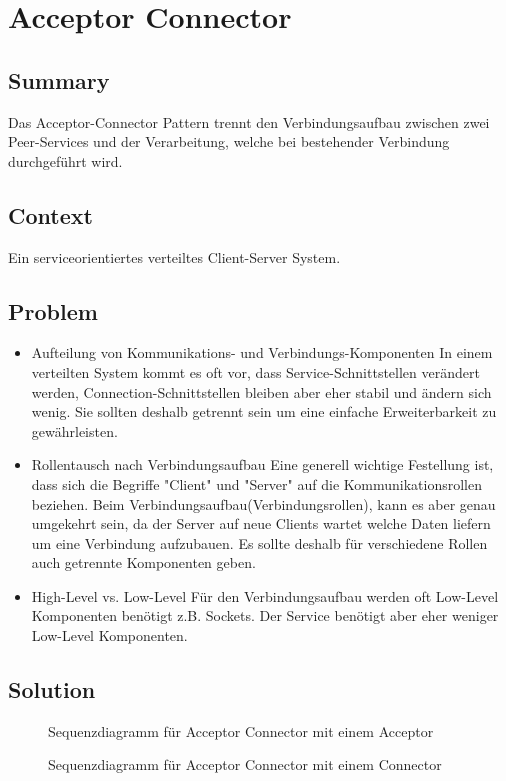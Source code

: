 \chapter{Acceptor Connector}

\section{Summary}
Das Acceptor-Connector Pattern trennt den Verbindungsaufbau zwischen zwei Peer-Services und der Verarbeitung, welche bei bestehender Verbindung durchgeführt wird.

\section{Context}
Ein serviceorientiertes verteiltes Client-Server System.

\section{Problem}
\begin{itemize}
  \item Aufteilung von Kommunikations- und Verbindungs-Komponenten In einem verteilten System kommt es oft vor, dass Service-Schnittstellen verändert werden, Connection-Schnittstellen bleiben aber eher stabil und ändern sich wenig. Sie sollten deshalb getrennt sein um eine einfache Erweiterbarkeit zu gewährleisten.
  \item Rollentausch nach Verbindungsaufbau Eine generell wichtige Festellung ist, dass sich die Begriffe "Client" und "Server" auf die Kommunikationsrollen beziehen. Beim Verbindungsaufbau(Verbindungsrollen), kann es aber genau umgekehrt sein, da der Server auf neue Clients wartet welche Daten liefern um eine Verbindung aufzubauen. Es sollte deshalb für verschiedene Rollen auch getrennte Komponenten geben.
  \item High-Level vs. Low-Level Für den Verbindungsaufbau werden oft Low-Level Komponenten benötigt z.B. Sockets. Der Service benötigt aber eher weniger Low-Level Komponenten.
\end{itemize}

\section{Solution}
\begin{figure}[H]
  \centering
  
  \caption{Sequenzdiagramm f\"ur Acceptor Connector mit einem Acceptor}
\end{figure}
\begin{figure}[H]
  \centering
  
  \caption{Sequenzdiagramm f\"ur Acceptor Connector mit einem Connector}
\end{figure}

